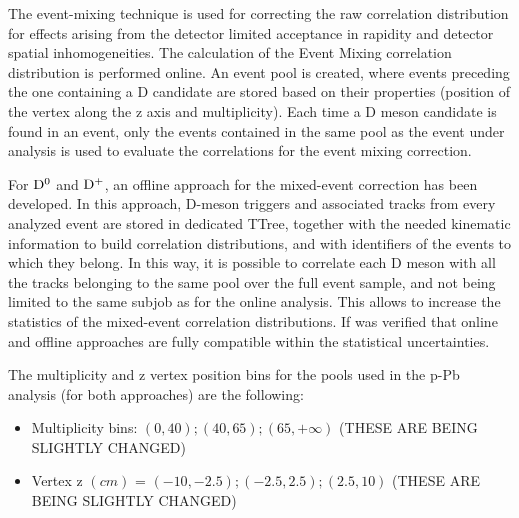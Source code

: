 %
\label{MEsection}
The event-mixing technique is used for correcting the raw correlation distribution for effects arising
from the detector limited acceptance in rapidity and detector spatial inhomogeneities. The calculation of the Event
Mixing correlation distribution is performed online. %
An event pool is created, where events preceding the one containing a D candidate are stored based on their properties (position of the vertex along the z axis and multiplicity).
Each time a D meson candidate is found in an event, only the events contained in the same pool as the event under analysis is used to evaluate the correlations for the event mixing correction.%

For ${\rm D^0}$ and ${\rm D^+}$, an offline approach for the mixed-event correction has been developed. In this approach, D-meson triggers and associated tracks from every analyzed event are stored in dedicated TTree, together with the needed kinematic information to build correlation distributions, and with identifiers of the events to which they belong. In this way, it is possible to correlate each D meson with all the tracks belonging to the same pool over the full event sample, and not being limited to the same subjob as for the online analysis. This allows to increase the statistics of the mixed-event correlation distributions. If was verified that online and offline approaches are fully compatible within the statistical uncertainties.

The multiplicity and z vertex position bins for the pools used in the p-Pb analysis (for both approaches) are the following:
\begin{itemize}
\item Multiplicity bins: $\left(0,40\right);\left(40,65\right);\left(65,+\infty\right)$ (THESE ARE BEING SLIGHTLY CHANGED)
\item Vertex z $(cm)$ = $\left(-10,-2.5\right);\left(-2.5,2.5\right);\left(2.5,10\right)$ (THESE ARE BEING SLIGHTLY CHANGED)
\end{itemize}

